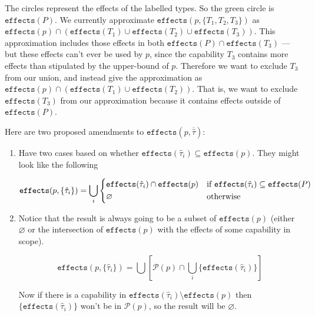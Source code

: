 \documentclass{llncs}
\newcommand{\keywadj}[1]{\mathtt{#1}}
\newcommand{\kwa}[1]{\keywadj{ #1 }}
\newcommand{\fx}[1]{ \kwa{effects}(#1) }
\begin{document}
The circles represent the effects of the labelled types. So the green circle is $\kwa{effects}(P)$. We currently approximate $\kwa{effects}(p, \{ T_1, T_2, T_3\})$ as $\kwa{effects}(p) \cap (\kwa{effects}(T_1) \cup \kwa{effects}(T_2) \cup \kwa{effects}(T_3))$. This approximation includes those effects in both $\fx{P} \cap \fx{T_3}$ --- but these effects can't ever be used by $p$, since the capability $T_3$ contains more effects than stipulated by the upper-bound of $p$. Therefore we want to exclude $T_3$ from our union, and instead give the approximation as $\kwa{effects}(p) \cap (\kwa{effects}(T_1) \cup \kwa{effects}(T_2))$. That is, we want to exclude $\fx{T_3}$ from our approximation because it contains effects outside of $\fx{P}$.

Here are two proposed amendments to $\kwa{effects}(p, \overline{\hat \tau})$:

\begin{enumerate}

	\item Have two cases based on whether $\kwa{effects}(\hat \tau_i) \subseteq \kwa{effects}(p)$. They might look like the following

  \begin{equation*}
    \kwa{effects}(p, \{\hat \tau_i\})  = \bigcup_{i}
    \begin{cases*}
      \fx{\hat \tau_i} \cap \fx{p}        & if $\fx{\hat \tau_i} \subseteq \fx{P}$ \\
      \varnothing & otherwise
    \end{cases*}
  \end{equation*}

	\item Notice that the result is always going to be a subset of $\kwa{effects}(p)$ (either $\varnothing$ or the intersection of $\kwa{effects}(p)$ with the effects of some capability in scope).
	
   \begin{equation*}
    \kwa{effects}(p, \{\hat \tau_i\})  = \bigcup[\mathcal{P}(p) \cap \bigcup_{i} \{\fx{\hat \tau_i}\}]
  \end{equation*}
  
Now if there is a capability in $\fx{\hat \tau_i} \setminus \fx{p}$ then $\{ \fx{\hat \tau_i} \}$ won't be in $\mathcal{P}(p)$, so the result will be $\varnothing$.
  
\end{enumerate}

\end{document}
